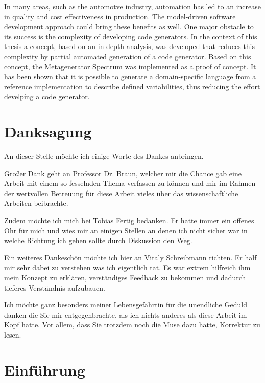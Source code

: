 \documentclass[12pt,oneside,a4paper,parskip]{scrbook}
\begin{document}
In many areas, such as the automotve industry, automation has led to an increase in quality and cost effectiveness in production. The model-driven software development approach could bring these benefits as well. One major obstacle to its success is the complexity of developing code generators. In the context of this thesis a concept, based on an in-depth analysis, was developed that reduces this complexity by partial automated generation of a code generator. Based on this concept, the Metagenerator Spectrum was implemented as a proof of concept. It has been shown that it is possible to generate a domain-specific language from a reference implementation to describe defined variabilities, thus reducing the effort develping a code generator.

\newpage
\chapter*{Danksagung}

An dieser Stelle möchte ich einige Worte des Dankes anbringen. 

Großer Dank geht an Professor Dr. Braun, welcher mir die Chance gab eine Arbeit mit einem so fesselnden Thema verfassen zu können und mir im Rahmen der wertvollen Betreuung für diese Arbeit vieles über das wissenschaftliche Arbeiten beibrachte.

Zudem möchte ich mich bei Tobias Fertig bedanken. Er hatte immer ein offenes Ohr für mich und wies mir an einigen Stellen an denen ich nicht sicher war in welche Richtung ich gehen sollte durch Diskussion den Weg.

Ein weiteres Dankeschön möchte ich hier an Vitaly Schreibmann richten. Er half mir sehr dabei zu verstehen was ich eigentlich tat. Es war extrem hilfreich ihm mein Konzept zu erklären, verständiges Feedback zu bekommen und dadurch tieferes Verständnis aufzubauen.

Ich möchte ganz besonders meiner Lebensgefährtin für die unendliche Geduld danken die Sie mir entgegenbrachte, als ich nichts anderes als diese Arbeit im Kopf hatte. Vor allem, dass Sie trotzdem noch die Muse dazu hatte, Korrektur zu lesen.

\tableofcontents



\mainmatter


\chapter{Einführung}\label{ch:intro}
\end{document}
